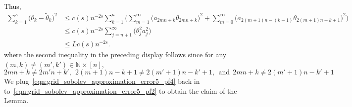 \documentclass{article}
\newcommand{\1}{\mathbf{1}}
\newcommand{\wt}[1]{\widetilde{#1}}
\theoremstyle{alden}
\theoremstyle{aldenthm}
\theoremstyle{definition}
\theoremstyle{remark}
\begin{document}
Thus,
\begin{align}
\sum_{k = 1}^{\kappa} \bigl(\theta_k - \wt{\theta}_k\bigr)^2 & \leq c(s) n^{-2s}\sum_{k = 1}^{\kappa} \biggl(\sum_{m = 1}^{\infty} \bigl(a_{2mn + k}\theta_{2mn + k}\bigr)^2 + \sum_{m = 0}^{\infty}\bigl(a_{2(m + 1)n - (k - 1)}\theta_{2(m + 1)n - k + 1} \bigr)^2\biggr) \nonumber \\
& \leq c(s) n^{-2s} \sum_{j = n + 1}^{\infty} \bigl(\theta_j^2 a_j^2)
\nonumber \\
& \leq L c(s) n^{-2s}. \label{eqn:grid_sobolev_approximation_error5_pf4}
\end{align}
where the second inequality in the preceding display follows since for any $(m,k) \neq (m',k') \in \mathbb{N} \times [n]$,
\begin{equation*}
2mn + k \neq 2m'n + k',~~ 2(m + 1)n - k + 1 \neq 2(m' + 1)n - k' + 1, ~~\textrm{and}~~  2mn + k \neq 2(m' + 1)n - k' + 1
\end{equation*}
We plug~\eqref{eqn:grid_sobolev_approximation_error5_pf4} back in to~\eqref{eqn:grid_sobolev_approximation_error5_pf2} to obtain the claim of the Lemma.
\end{document}
